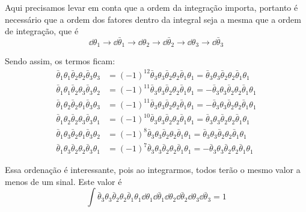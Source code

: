 Aqui precisamos levar em conta que a ordem da integração importa, portanto é necessário que a ordem dos fatores dentro da integral seja a mesma que a ordem de integração, que é
    \begin{equation*}
        \dd{\theta_{1}} \to \dd{\bar{\theta}_{1}} \to \dd{\theta_{2}} \to \dd{\bar{\theta}_{2}} \to \dd{\theta_{3}} \to \dd{\bar{\theta}_{3}}
    \end{equation*}

Sendo assim, os termos ficam:
    \begin{align*}
        \bar{\theta}_{1}\theta_{1}\bar{\theta}_{2}\theta_{2}\bar{\theta}_{3}\theta_{3} &= (-1)^{12} \bar{\theta}_{3}\theta_{3}\bar{\theta}_{2}\theta_{2}\bar{\theta}_{1}\theta_{1} = \bar{\theta}_{3}\theta_{3}\bar{\theta}_{2}\theta_{2}\bar{\theta}_{1}\theta_{1} \\
        \bar{\theta}_{1}\theta_{1}\bar{\theta}_{2}\theta_{3}\bar{\theta}_{3}\theta_{2} &= (-1)^{11}\bar{\theta}_{3}\theta_{3}\bar{\theta}_{2}\theta_{2}\bar{\theta}_{1}\theta_{1} = -\bar{\theta}_{3}\theta_{3}\bar{\theta}_{2}\theta_{2}\bar{\theta}_{1}\theta_{1}\\
        \bar{\theta}_{1}\theta_{2}\bar{\theta}_{2}\theta_{1}\bar{\theta}_{3}\theta_{3} &= (-1)^{11}\bar{\theta}_{3}\theta_{3}\bar{\theta}_{2}\theta_{2}\bar{\theta}_{1}\theta_{1} = -\bar{\theta}_{3}\theta_{3}\bar{\theta}_{2}\theta_{2}\bar{\theta}_{1}\theta_{1}\\
        \bar{\theta}_{1}\theta_{2}\bar{\theta}_{2}\theta_{3}\bar{\theta}_{3}\theta_{1} &= (-1)^{10}\bar{\theta}_{3}\theta_{3}\bar{\theta}_{2}\theta_{2}\bar{\theta}_{1}\theta_{1} = \bar{\theta}_{3}\theta_{3}\bar{\theta}_{2}\theta_{2}\bar{\theta}_{1}\theta_{1}\\
        \bar{\theta}_{1}\theta_{3}\bar{\theta}_{2}\theta_{1}\bar{\theta}_{3}\theta_{2} &= (-1)^{8}\bar{\theta}_{3}\theta_{3}\bar{\theta}_{2}\theta_{2}\bar{\theta}_{1}\theta_{1} = \bar{\theta}_{3}\theta_{3}\bar{\theta}_{2}\theta_{2}\bar{\theta}_{1}\theta_{1}\\
        \bar{\theta}_{1}\theta_{3}\bar{\theta}_{2}\theta_{2}\bar{\theta}_{3}\theta_{1} &= (-1)^{7}\bar{\theta}_{3}\theta_{3}\bar{\theta}_{2}\theta_{2}\bar{\theta}_{1}\theta_{1} = -\bar{\theta}_{3}\theta_{3}\bar{\theta}_{2}\theta_{2}\bar{\theta}_{1}\theta_{1}
    \end{align*}

Essa ordenação é interessante, pois ao integrarmos, todos terão o mesmo valor a menos de um sinal. Este valor é
    \begin{equation*}
        \int \bar{\theta}_{3}\theta_{3}\bar{\theta}_{2}\theta_{2}\bar{\theta}_{1}\theta_{1} \dd{\theta_{1}} \dd{\bar{\theta}_{1}} \dd{\theta_{2}} \dd{\bar{\theta}_{2}} \dd{\theta}_{3} \dd{\bar{\theta}_{3}} = 1
    \end{equation*}

